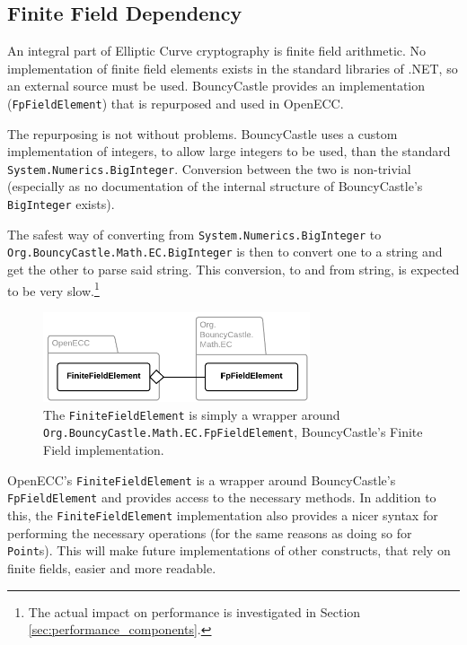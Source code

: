 \subsection{Finite Field Dependency}
\label{sec:implementation__dependencies}
\label{sec:implementation_dependency}

An integral part of Elliptic Curve cryptography is finite field arithmetic. No implementation of finite field elements exists
in the standard libraries of .NET, so an external source must be used. BouncyCastle provides an implementation (\texttt{FpFieldElement})
that is repurposed and used in OpenECC.

The repurposing is not without problems. BouncyCastle uses a custom implementation of integers, to allow large integers to
be used, than the standard \texttt{System.Numerics.BigInteger}. Conversion between the two is non-trivial (especially as no documentation
of the internal structure of BouncyCastle's \texttt{BigInteger} exists).

The safest way of converting from \texttt{System.Numerics.BigInteger} to \\
\texttt{Org.BouncyCastle.Math.EC.BigInteger} is then to
convert one to a string and get the other to parse said string. This conversion, to and from string, is expected to be very slow.\footnote{The
actual impact on performance is investigated in Section \ref{sec:performance_components}.}

\begin{figure}[htb]
	\centering
	\includegraphics[width=0.7\textwidth]{implementation/finitefields}
	\caption{The \texttt{FiniteFieldElement} is simply a wrapper around \texttt{Org.BouncyCastle.Math.EC.FpFieldElement},
		BouncyCastle's Finite Field implementation.}
\end{figure}

OpenECC's \texttt{FiniteFieldElement} is a wrapper around BouncyCastle's \\
\verb+FpFieldElement+ and provides access to the necessary methods.
In addition to this, the \texttt{FiniteFieldElement} implementation also provides a nicer syntax for performing the necessary operations
(for the same reasons as doing so for \texttt{Point}s). This will make future implementations of other constructs, that rely on finite fields,
easier and more readable.